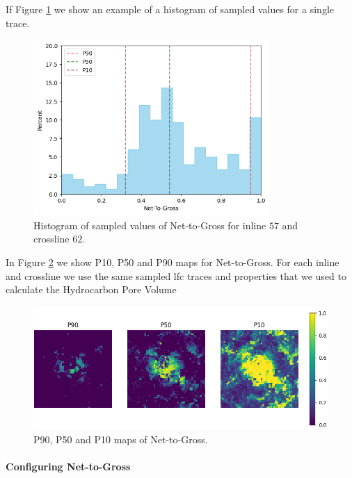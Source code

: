 \documentclass[note,screen,english,12pt,utf8]{nrdoc}
\begin{document}
If Figure \ref{fig:net_to_gross_histogram} we show an example of a histogram
of sampled values for a single trace.
\begin{figure}[h]
    \centering
    \includegraphics[width=0.8\textwidth]{figures/net_to_gross_il57_xl62.png}
    \caption{Histogram of sampled values of Net-to-Gross for inline $57$ and crossline $62$.}
    \label{fig:net_to_gross_histogram}
\end{figure}


In Figure \ref{fig:net_to_gross_maps} we show P10, P50 and P90 maps for
Net-to-Gross. For each inline and crossline we use the same sampled lfc
traces and properties that we used to calculate the Hydrocarbon Pore Volume

\begin{figure}[h]
    \centering
    \includegraphics[width=\textwidth]{figures/net_to_gross_p90_p50_p10.png}
    \caption{P90, P50 and P10 maps of Net-to-Gross.}
    \label{fig:net_to_gross_maps}
\end{figure}


\paragraph{Configuring Net-to-Gross}
\end{document}
